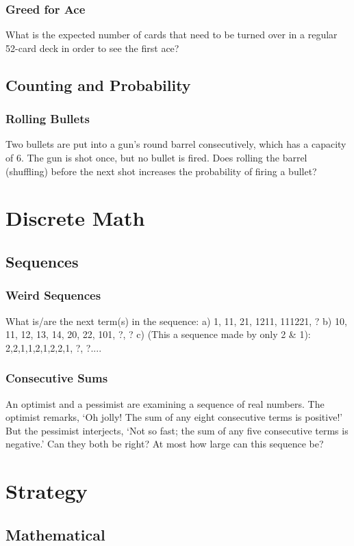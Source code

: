 \documentclass{article}
\begin{document}
\subsubsection{Greed for Ace}
What is the expected number of cards that need to be turned over in a regular 52-card deck in order to see the first ace?
\subsection{Counting and Probability}
\subsubsection{Rolling Bullets}
Two bullets are put into a gun's round barrel consecutively, which has a capacity of 6. The gun is shot once, but no bullet is fired. Does rolling the barrel (shuffling) before the next shot increases the probability of firing a bullet?
\section{Discrete Math}
\subsection{Sequences}
\subsubsection{Weird Sequences}
What is/are the next term(s) in the sequence:\newline
a) 1, 11, 21, 1211, 111221, ?\newline
b) 10, 11, 12, 13, 14, 20, 22, 101, ?, ?\newline
c) (This a sequence made by only 2 & 1): 2,2,1,1,2,1,2,2,1, ?, ?....
\subsubsection{Consecutive Sums}
An optimist and a pessimist are examining a sequence of real numbers. The optimist remarks, ‘Oh jolly! The sum of any eight consecutive terms is positive!’ But the pessimist interjects, ‘Not so fast; the sum of any five consecutive terms is negative.’ Can they both be right? At most how large can this sequence be?
\section{Strategy}
\subsection{Mathematical}
\end{document}
